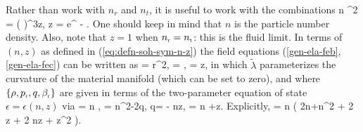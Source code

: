 Rather than work with $n_r$ and $n_t$, it is useful to work with the combinations
\bse
\label{eq:defn-soh-sym-n-z}
\bea
n  {}^2 = \left( \right)^3z,
\eea
\bea
\label{eq:defn-soh-symz}
z  {} = e^{\tilde{\lambda} - \lambda} .
\eea
\ese
One should keep in mind that $n$ is the particle number density. Also, note that $z=1$ when ${n}_{\scriptscriptstyle{\textrm{r}}}={n}_{\scriptscriptstyle{\textrm{t}}}$: this is the fluid limit. In terms of $(n,z)$ as defined in (\ref{eq:defn-soh-sym-n-z}) the field equations (\ref{gen-ela-feb}, \ref{gen-ela-fec}) can be written as
\bse
\label{eq:fiedeqns-elast-general-1}
\bea
{}= \half \kappa r^2\rho,
\eea
\bea
{} = ,
\eea
\bea
{} = z,
\eea
\ese
in which $\tilde{\lambda}$ parameterizes the curvature of the material manifold (which can   be set to zero), and where $\left\{\rho, {p}_{\scriptscriptstyle{\textrm{r}}},q,{\beta}_{\scriptscriptstyle{\textrm{r}}}\right\}$ are given in terms of the two-parameter equation of state $\epsilon = \epsilon(n,z)$ via
\bse
\bea
\rho = n \epsilon,\qquad
{} = n^2-2q,
\eea
\bea
q= - \half nz,\qquad
{} = n +z.
\eea
\ese
Explicitly,
\bea
{} = n \left( 2n+n^2 + 2 z + 2 nz + z^2 \right).
\eea

